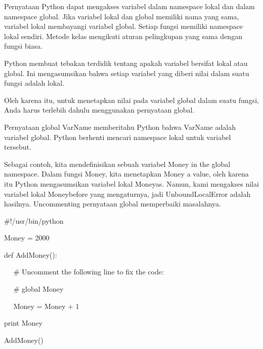 \noindent 
Pernyataan Python dapat mengakses variabel dalam namespace lokal dan dalam namespace global. Jika variabel lokal dan global memiliki nama yang sama, variabel lokal membayangi variabel global. Setiap fungsi memiliki namespace lokal sendiri. Metode kelas mengikuti aturan pelingkupan yang sama dengan fungsi biasa. \par
\noindent 
Python membuat tebakan terdidik tentang apakah variabel bersifat lokal atau global. Ini mengasumsikan bahwa setiap variabel yang diberi nilai dalam suatu fungsi adalah lokal. \par
\noindent 
Oleh karena itu, untuk menetapkan nilai pada variabel global dalam suatu fungsi, Anda harus terlebih dahulu menggunakan pernyataan global. \par
\noindent 
Pernyataan global VarName memberitahu Python bahwa VarName adalah variabel global. Python berhenti mencari namespace lokal untuk variabel tersebut. \par
\noindent 
Sebagai contoh, kita mendefinisikan sebuah variabel Money in the global namespace. Dalam fungsi Money, kita menetapkan Money a value, oleh karena itu Python mengasumsikan variabel lokal Moneyas. Namun, kami mengakses nilai variabel lokal Moneybefore yang mengaturnya, jadi UnboundLocalError adalah hasilnya. Uncommenting pernyataan global memperbaiki masalahnya. \par
\noindent 
 \hspace*{0.5in}  $  \#  $!/usr/bin/python \par
\vspace{12pt}
\noindent 
 \hspace*{0.5in} Money = 2000 \par
\noindent 
 \hspace*{0.5in} def AddMoney(): \par
\noindent 
 \hspace*{0.5in} ~~  $  \#  $ Uncomment the following line to fix the code: \par
\noindent 
 \hspace*{0.5in} ~~  $  \#  $ global Money \par
\noindent 
 \hspace*{0.5in} ~~ Money = Money + 1 \par
\vspace{12pt}
\noindent 
 \hspace*{0.5in} print Money \par
\noindent 
 \hspace*{0.5in} AddMoney() \par
